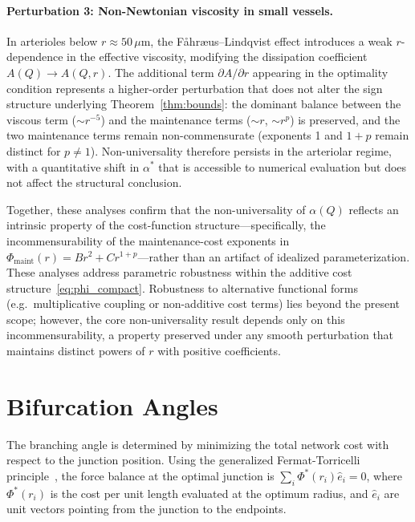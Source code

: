 \documentclass[11pt,a4paper]{article}
\theoremstyle{remark}
\begin{document}
\paragraph{Perturbation 3: Non-Newtonian viscosity in small vessels.}
In arterioles below $r \approx 50\,\mu\mathrm{m}$, the F\aa hr\ae us--Lindqvist
effect introduces a weak $r$-dependence in the effective viscosity, modifying
the dissipation coefficient $A(Q) \to A(Q,r)$. The additional term $\partial
A/\partial r$ appearing in the optimality condition represents a higher-order
perturbation that does not alter the sign structure underlying
Theorem~\ref{thm:bounds}: the dominant balance between the viscous term ($\sim
r^{-5}$) and the maintenance terms ($\sim r$, $\sim r^p$) is preserved, and the
two maintenance terms remain non-commensurate (exponents 1 and $1+p$ remain
distinct for $p \neq 1$). Non-universality therefore persists in the arteriolar
regime, with a quantitative shift in $\alpha^*$ that is accessible to numerical
evaluation but does not affect the structural conclusion.

Together, these analyses confirm that the non-universality of $\alpha(Q)$
reflects an intrinsic property of the cost-function structure---specifically,
the incommensurability of the maintenance-cost exponents in
$\Phi_{\mathrm{maint}}(r) = Br^2 + Cr^{1+p}$---rather than an artifact of
idealized parameterization. These analyses address parametric robustness
within the additive cost structure~\eqref{eq:phi_compact}. Robustness to
alternative functional forms (e.g.\ multiplicative coupling or non-additive
cost terms) lies beyond the present scope; however, the core non-universality
result depends only on this incommensurability, a property preserved under
any smooth perturbation that maintains distinct powers of $r$ with positive
coefficients.

\section{Bifurcation Angles}
\label{sec:angles}

The branching angle is determined by minimizing the total network cost with
respect to the junction position. Using the generalized Fermat-Torricelli
principle~\cite{Zamir1978,Huo2012}, the force balance at the optimal junction
is $\sum_i \Phi^*(r_i)\hat{e}_i = 0$, where $\Phi^*(r_i)$ is the cost per unit
length evaluated at the optimum radius, and $\hat{e}_i$ are unit vectors
pointing from the junction to the endpoints.
\end{document}
